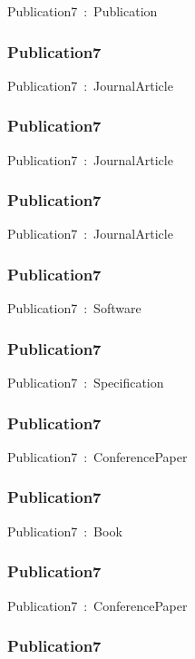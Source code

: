 \documentclass{article}
\begin{document}
Publication7~:~Publication

\subsubsection*{Publication7}

Publication7~:~JournalArticle

\subsubsection*{Publication7}

Publication7~:~JournalArticle

\subsubsection*{Publication7}

Publication7~:~JournalArticle

\subsubsection*{Publication7}

Publication7~:~Software

\subsubsection*{Publication7}

Publication7~:~Specification

\subsubsection*{Publication7}

Publication7~:~ConferencePaper

\subsubsection*{Publication7}

Publication7~:~Book

\subsubsection*{Publication7}

Publication7~:~ConferencePaper

\subsubsection*{Publication7}
\end{document}

